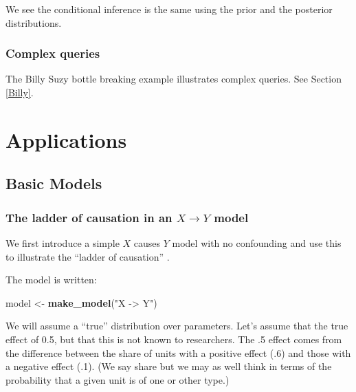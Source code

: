 \documentclass[
  12pt,
]{book}
\newenvironment{Shaded}{\begin{snugshade}}{\end{snugshade}}
\newcommand{\FunctionTok}[1]{\textcolor[rgb]{0.13,0.29,0.53}{\textbf{#1}}}
\newcommand{\NormalTok}[1]{#1}
\newcommand{\OtherTok}[1]{\textcolor[rgb]{0.56,0.35,0.01}{#1}}
\newcommand{\StringTok}[1]{\textcolor[rgb]{0.31,0.60,0.02}{#1}}
\begin{document}
We see the conditional inference is the same using the prior and the posterior distributions.

\hypertarget{complex-queries}{%
\section{Complex queries}\label{complex-queries}}

The Billy Suzy bottle breaking example illustrates complex queries. See Section \ref{Billy}.

\hypertarget{part-applications}{%
\part{Applications}\label{part-applications}}

\hypertarget{applications}{%
\chapter{Basic Models}\label{applications}}

\hypertarget{the-ladder-of-causation-in-an-x-rightarrow-y-model}{%
\section{\texorpdfstring{The ladder of causation in an \(X \rightarrow Y\) model}{The ladder of causation in an X \textbackslash rightarrow Y model}}\label{the-ladder-of-causation-in-an-x-rightarrow-y-model}}

We first introduce a simple \(X\) causes \(Y\) model with no confounding and use this to illustrate the ``ladder of causation'' \citep{pearl2018book}.

The model is written:

\begin{Shaded}
\begin{Highlighting}[]
\NormalTok{model }\OtherTok{\textless{}{-}} \FunctionTok{make\_model}\NormalTok{(}\StringTok{"X {-}\textgreater{} Y"}\NormalTok{)}
\end{Highlighting}
\end{Shaded}

We will assume a ``true'' distribution over parameters. Let's assume that the true effect of 0.5, but that this is not known to researchers. The .5 effect comes from the difference between the share of units with a positive effect (.6) and those with a negative effect (.1). (We say share but we may as well think in terms of the probability that a given unit is of one or other type.)
\end{document}
